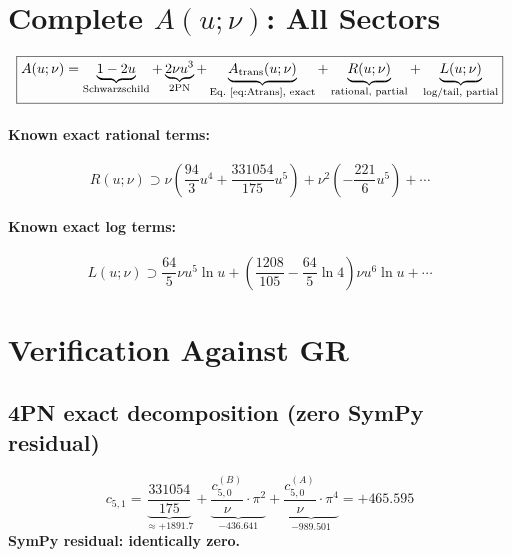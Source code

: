 \documentclass[11pt,a4paper]{article}
\theoremstyle{plain}
\theoremstyle{definition}
\theoremstyle{remark}
\newcommand{\cA}{c^{(A)}}
\newcommand{\cB}{c^{(B)}}
\begin{document}
\section{Complete $A(u;\nu)$: All Sectors}
\label{sec:A_full}

\begin{equation}
  \boxed{A(u;\nu) = \underbrace{1 - 2u}_{\text{Schwarzschild}}
    + \underbrace{2\nu u^3}_{\text{2PN}}
    + \underbrace{A_{\mathrm{trans}}(u;\nu)}_{\text{Eq.~\eqref{eq:Atrans}, exact}}
    + \underbrace{R(u;\nu)}_{\text{rational, partial}}
    + \underbrace{L(u;\nu)}_{\text{log/tail, partial}}}
  \label{eq:A_full}
\end{equation}

\paragraph{Known exact rational terms:}
\begin{equation}
  R(u;\nu) \supset \nu\!\left(\frac{94}{3}u^4 + \frac{331054}{175}u^5\right)
  + \nu^2\!\left(-\frac{221}{6}u^5\right) + \cdots
  \label{eq:R_known}
\end{equation}

\paragraph{Known exact log terms:}
\begin{equation}
  L(u;\nu) \supset \frac{64}{5}\nu u^5\ln u
  + \left(\frac{1208}{105} - \frac{64}{5}\ln 4\right)\nu u^6\ln u + \cdots
  \label{eq:L_known}
\end{equation}

\section{Verification Against GR}
\label{sec:verification}

\subsection{4PN exact decomposition (zero SymPy residual)}

\begin{equation}
  c_{5,1} = \underbrace{\frac{331054}{175}}_{\approx+1891.7}
    + \underbrace{\frac{\cB_{5,0}}{\nu}\cdot\pi^2}_{-436.641}
    + \underbrace{\frac{\cA_{5,0}}{\nu}\cdot\pi^4}_{-989.501}
  = +465.595
  \label{eq:c51_verify}
\end{equation}
\textbf{SymPy residual: identically zero.}
\end{document}
